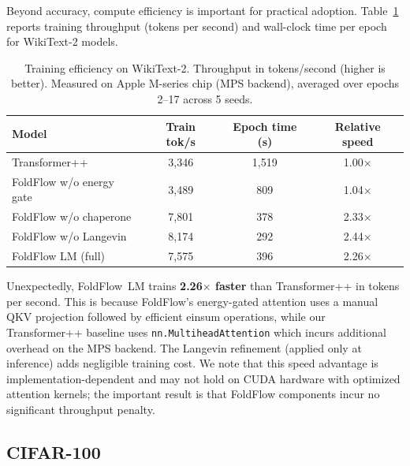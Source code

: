 \documentclass[10pt]{article}
\begin{document}
Beyond accuracy, compute efficiency is important for practical adoption.
Table~\ref{tab:throughput} reports training throughput (tokens per
second) and wall-clock time per epoch for WikiText-2 models.

\begin{table}[t]
\centering
\caption{Training efficiency on WikiText-2.  Throughput in tokens/second
  (higher is better).  Measured on Apple M-series chip (MPS backend), averaged over
  epochs 2--17 across 5 seeds.}
\label{tab:throughput}
\small
\begin{tabular}{@{}lccc@{}}
\toprule
Model & Train tok/s & Epoch time (s) & Relative speed \\
\midrule
Transformer++           & 3,346 & 1,519 & 1.00$\times$ \\
FoldFlow w/o energy gate & 3,489 & 809 & 1.04$\times$\footnotemark \\
FoldFlow w/o chaperone  & 7,801 & 378 & 2.33$\times$ \\
FoldFlow w/o Langevin   & 8,174 & 292 & 2.44$\times$ \\
FoldFlow LM (full)      & 7,575 & 396 & 2.26$\times$ \\
\bottomrule
\end{tabular}
\end{table}


Unexpectedly, FoldFlow~LM trains \textbf{2.26$\times$ faster} than
Transformer++ in tokens per second.  This is because FoldFlow's
energy-gated attention uses a manual QKV projection followed by
efficient einsum operations, while our Transformer++ baseline uses
\texttt{nn.MultiheadAttention} which incurs additional overhead on
the MPS backend.  The Langevin refinement (applied only at inference)
adds negligible training cost.  We note that this speed advantage is
implementation-dependent and may not hold on CUDA hardware with
optimized attention kernels; the important result is that FoldFlow
components incur no significant throughput penalty.

\subsection{CIFAR-100}
\label{sec:cifar100}
\end{document}
